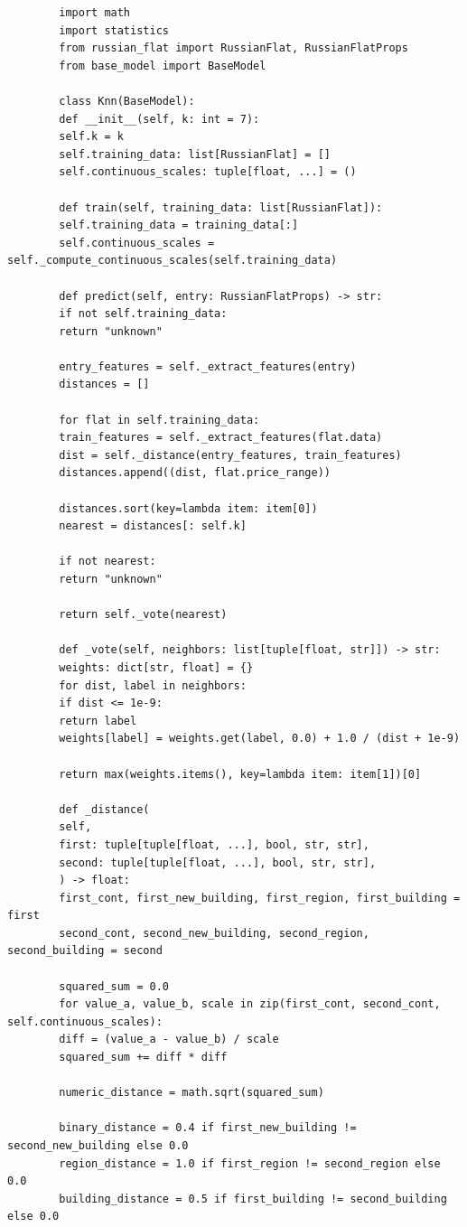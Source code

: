 \documentclass[12pt,a4paper]{article}
\begin{document}
	\begin{lstlisting}
		import math
		import statistics
		from russian_flat import RussianFlat, RussianFlatProps
		from base_model import BaseModel
		
		class Knn(BaseModel):
		def __init__(self, k: int = 7):
		self.k = k
		self.training_data: list[RussianFlat] = []
		self.continuous_scales: tuple[float, ...] = ()
		
		def train(self, training_data: list[RussianFlat]):
		self.training_data = training_data[:]
		self.continuous_scales = self._compute_continuous_scales(self.training_data)
		
		def predict(self, entry: RussianFlatProps) -> str:
		if not self.training_data:
		return "unknown"
		
		entry_features = self._extract_features(entry)
		distances = []
		
		for flat in self.training_data:
		train_features = self._extract_features(flat.data)
		dist = self._distance(entry_features, train_features)
		distances.append((dist, flat.price_range))
		
		distances.sort(key=lambda item: item[0])
		nearest = distances[: self.k]
		
		if not nearest:
		return "unknown"
		
		return self._vote(nearest)
		
		def _vote(self, neighbors: list[tuple[float, str]]) -> str:
		weights: dict[str, float] = {}
		for dist, label in neighbors:
		if dist <= 1e-9:
		return label
		weights[label] = weights.get(label, 0.0) + 1.0 / (dist + 1e-9)
		
		return max(weights.items(), key=lambda item: item[1])[0]
		
		def _distance(
		self,
		first: tuple[tuple[float, ...], bool, str, str],
		second: tuple[tuple[float, ...], bool, str, str],
		) -> float:
		first_cont, first_new_building, first_region, first_building = first
		second_cont, second_new_building, second_region, second_building = second
		
		squared_sum = 0.0
		for value_a, value_b, scale in zip(first_cont, second_cont, self.continuous_scales):
		diff = (value_a - value_b) / scale
		squared_sum += diff * diff
		
		numeric_distance = math.sqrt(squared_sum)
		
		binary_distance = 0.4 if first_new_building != second_new_building else 0.0
		region_distance = 1.0 if first_region != second_region else 0.0
		building_distance = 0.5 if first_building != second_building else 0.0
		

\end{lstlisting}
\end{document}
